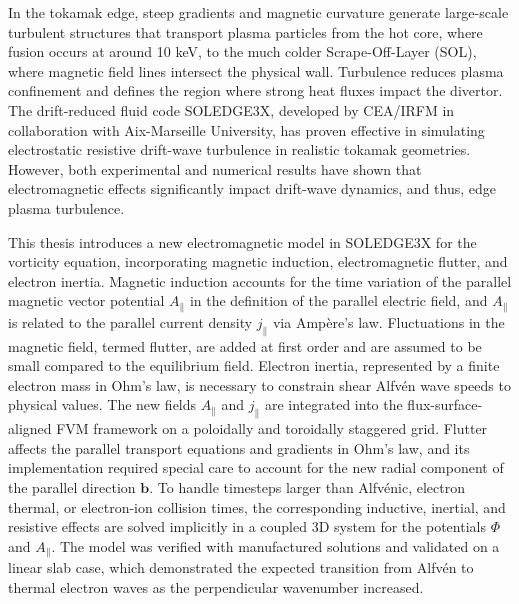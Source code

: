 \label{chap:abstract}

In the tokamak edge, steep gradients and magnetic curvature generate large-scale turbulent structures that transport plasma particles from the hot core, where fusion occurs at around 10 keV, to the much colder Scrape-Off-Layer (SOL), where magnetic field lines intersect the physical wall. Turbulence reduces plasma confinement and defines the region where strong heat fluxes impact the divertor. The drift-reduced fluid code SOLEDGE3X, developed by CEA/IRFM in collaboration with Aix-Marseille University, has proven effective in simulating electrostatic resistive drift-wave turbulence in realistic tokamak geometries. However, both experimental and numerical results have shown that electromagnetic effects significantly impact drift-wave dynamics, and thus, edge plasma turbulence. 

This thesis introduces a new electromagnetic model in SOLEDGE3X for the vorticity equation, incorporating magnetic induction, electromagnetic flutter, and electron inertia. Magnetic induction accounts for the time variation of the parallel magnetic vector potential $A_\parallel$ in the definition of the parallel electric field, and $A_\parallel$ is related to the parallel current density $j_\parallel$ via Ampère's law. Fluctuations in the magnetic field, termed flutter, are added at first order and are assumed to be small compared to the equilibrium field. Electron inertia, represented by a finite electron mass in Ohm's law, is necessary to constrain shear Alfvén wave speeds to physical values. The new fields $A_\parallel$ and $j_\parallel$ are integrated into the flux-surface-aligned FVM framework on a poloidally and toroidally staggered grid. Flutter affects the parallel transport equations and gradients in Ohm's law, and its implementation required special care to account for the new radial component of the parallel direction $\textbf{b}$. To handle timesteps larger than Alfvénic, electron thermal, or electron-ion collision times, the corresponding inductive, inertial, and resistive effects are solved implicitly in a coupled 3D system for the potentials $\Phi$ and $A_\parallel$. The model was verified with manufactured solutions and validated on a linear slab case, which demonstrated the expected transition from Alfvén to thermal electron waves as the perpendicular wavenumber increased. 

